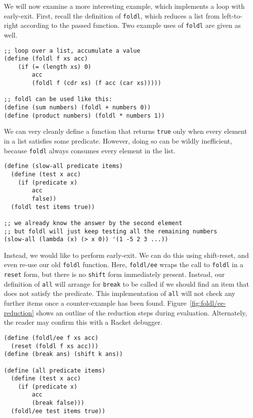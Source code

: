\documentclass[11pt]{article}
\begin{document}
We will now examine a more interesting example, which implements a loop with early-exit.
First, recall the definition of \texttt{foldl}, which reduces a list from left-to-right according to the passed function.
Two example uses of \texttt{foldl} are given as well.

\begin{verbatim}
;; loop over a list, accumulate a value
(define (foldl f xs acc)
    (if (= (length xs) 0)
        acc
        (foldl f (cdr xs) (f acc (car xs)))))

;; foldl can be used like this:
(define (sum numbers) (foldl + numbers 0))
(define (product numbers) (foldl * numbers 1))
\end{verbatim}

We can very cleanly define a function that returns \texttt{true} only when every element in a list satisfies some predicate.
However, doing so can be wildly inefficient, because \texttt{foldl} always consumes every element in the list.

\begin{verbatim}
(define (slow-all predicate items)
  (define (test x acc)
    (if (predicate x)
        acc
        false))
  (foldl test items true))
  
;; we already know the answer by the second element
;; but foldl will just keep testing all the remaining numbers
(slow-all (lambda (x) (> x 0)) '(1 -5 2 3 ...))
\end{verbatim}

Instead, we would like to perform early-exit.
We can do this using shift-reset, and even re-use our old \texttt{foldl} function.
Here, \texttt{foldl/ee} wraps the call to \texttt{foldl} in a \texttt{reset} form, but there is no \texttt{shift} form immediately present.
Instead, our definition of \texttt{all} will arrange for \texttt{break} to be called if we should find an item that does not satisfy the predicate.
This implementation of \texttt{all} will not check any further items once a counter-example has been found.
Figure~\ref{fig:foldl/ee-reduction} shows an outline of the reduction steps during evaluation.
Alternately, the reader may confirm this with a Racket debugger.

\begin{verbatim}
(define (foldl/ee f xs acc)
  (reset (foldl f xs acc)))
(define (break ans) (shift k ans))

(define (all predicate items)
  (define (test x acc)
    (if (predicate x)
        acc
        (break false)))
  (foldl/ee test items true))
\end{verbatim}
\end{document}
